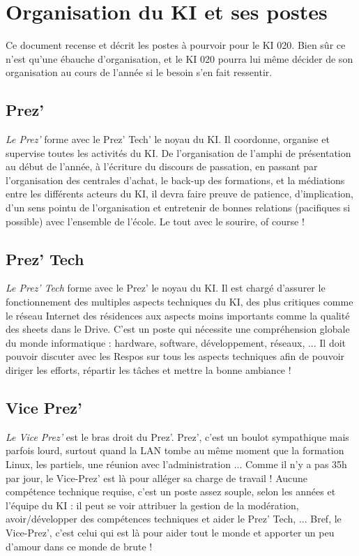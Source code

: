 \documentclass{ki019}
\begin{document}
\section{Organisation du KI et ses postes}


Ce document recense et décrit les postes à pourvoir pour le KI 020. Bien sûr ce n’est qu’une ébauche d’organisation, et le KI 020 pourra lui même décider de son organisation au cours de l’année si le besoin s’en fait ressentir.


\subsection{Prez'}

\emph{Le Prez’} forme avec le Prez’ Tech’ le noyau du KI. Il coordonne, organise et supervise toutes les activités du KI. De l’organisation de l’amphi de présentation au début de l’année, à l’écriture du discours de passation, en passant par l’organisation des centrales d’achat, le back-up des formations, et la médiations entre les différents acteurs du KI, il devra faire preuve de patience, d’implication, d’un sens pointu de l’organisation et entretenir de bonnes relations (pacifiques si possible) avec l’ensemble de l’école. Le tout avec le sourire, of course !

\subsection{Prez' Tech}

\emph{Le Prez’ Tech} forme avec le Prez’ le noyau du KI. Il est chargé d’assurer le fonctionnement des multiples aspects techniques du KI, des plus critiques comme le réseau Internet des résidences aux aspects moins importants comme la qualité des sheets dans le Drive. C’est un poste qui nécessite une compréhension globale du monde informatique : hardware, software, développement, réseaux, ... Il doit pouvoir discuter avec les Respos sur tous les aspects techniques afin de pouvoir diriger les efforts, répartir les tâches et mettre la bonne ambiance !

\subsection{Vice Prez'}

\emph{Le Vice Prez’} est le bras droit du Prez’. Prez’, c’est un boulot sympathique mais parfois lourd, surtout quand la LAN tombe au même moment que la formation Linux, les partiels, une réunion avec l’administration ... Comme il n’y a pas 35h par jour, le Vice-Prez’ est là pour alléger sa charge de travail ! Aucune compétence technique requise, c’est un poste assez souple, selon les années et l’équipe du KI : il peut se voir attribuer la gestion de la modération, avoir/développer des compétences techniques et aider le Prez’ Tech, ... Bref, le Vice-Prez’, c’est celui qui est là pour aider tout le monde et apporter un peu d’amour dans ce monde de brute !
\end{document}
